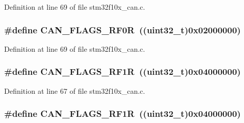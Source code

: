 Definition at line 69 of file stm32f10x\+\_\+can.\+c.

\subsubsection[{\texorpdfstring{C\+A\+N\+\_\+\+F\+L\+A\+G\+S\+\_\+\+R\+F0R}{CAN_FLAGS_RF0R}}]{\setlength{\rightskip}{0pt plus 5cm}\#define C\+A\+N\+\_\+\+F\+L\+A\+G\+S\+\_\+\+R\+F0R~(({\bf uint32\+\_\+t})0x02000000)}\hypertarget{group___c_a_n___private___defines_ga4b22b2552759778ac07825240823a45f}{}\label{group___c_a_n___private___defines_ga4b22b2552759778ac07825240823a45f}


Definition at line 69 of file stm32f10x\+\_\+can.\+c.

\subsubsection[{\texorpdfstring{C\+A\+N\+\_\+\+F\+L\+A\+G\+S\+\_\+\+R\+F1R}{CAN_FLAGS_RF1R}}]{\setlength{\rightskip}{0pt plus 5cm}\#define C\+A\+N\+\_\+\+F\+L\+A\+G\+S\+\_\+\+R\+F1R~(({\bf uint32\+\_\+t})0x04000000)}\hypertarget{group___c_a_n___private___defines_ga2a03d73273ab353c8deb3a4730431977}{}\label{group___c_a_n___private___defines_ga2a03d73273ab353c8deb3a4730431977}


Definition at line 67 of file stm32f10x\+\_\+can.\+c.

\subsubsection[{\texorpdfstring{C\+A\+N\+\_\+\+F\+L\+A\+G\+S\+\_\+\+R\+F1R}{CAN_FLAGS_RF1R}}]{\setlength{\rightskip}{0pt plus 5cm}\#define C\+A\+N\+\_\+\+F\+L\+A\+G\+S\+\_\+\+R\+F1R~(({\bf uint32\+\_\+t})0x04000000)}\hypertarget{group___c_a_n___private___defines_ga2a03d73273ab353c8deb3a4730431977}{}\label{group___c_a_n___private___defines_ga2a03d73273ab353c8deb3a4730431977}


